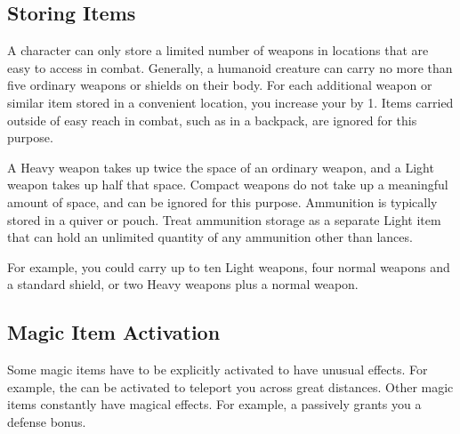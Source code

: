   \subsection{Storing Items}\label{Storing Items}
    A character can only store a limited number of weapons in locations that are easy to access in combat.
    Generally, a humanoid creature can carry no more than five ordinary weapons or shields on their body.
    For each additional weapon or similar item stored in a convenient location, you increase your  by 1.
    Items carried outside of easy reach in combat, such as in a backpack, are ignored for this purpose.

    A Heavy weapon takes up twice the space of an ordinary weapon, and a Light weapon takes up half that space.
    Compact weapons do not take up a meaningful amount of space, and can be ignored for this purpose.
    Ammunition is typically stored in a quiver or pouch.
    Treat ammunition storage as a separate Light item that can hold an unlimited quantity of any ammunition other than lances.

    For example, you could carry up to ten Light weapons, four normal weapons and a standard shield, or two Heavy weapons plus a normal weapon.

  \subsection{Magic Item Activation}

    Some magic items have to be explicitly activated to have unusual effects.
    For example, the  can be activated to teleport you across great distances.
    Other magic items constantly have magical effects.
    For example, a  passively grants you a defense bonus.

